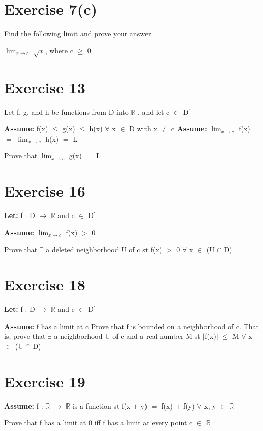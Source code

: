 \documentclass{article}
\newcommand{\mt}[1]{\ensuremath{#1}}
\newcommand\bsc[2][\DefaultOpt]{%
  \def\DefaultOpt{#2}%
  \section[#1]{#2}%
}
\newcommand{\lt}[1]{\textbf{Let: } #1}
\newcommand{\as}[1]{\textbf{Assume: } #1}
\newcommand{\br}{\mt{\mathbb{R}} }       %
\newcommand{\fa}{\mt{\forall} }          %
\newcommand{\mem}{\mt{\in} }
\newcommand{\exs}{\mt{\exists} }
\newcommand{\lra}{ \mt{\longrightarrow} } %
\newcommand{\av}[1]{\mt{|}#1\mt{|}}  %
\newcommand{\ps}{\mt{+} }
\newcommand{\gr}{\mt{>} }
\newcommand{\lse}{\mt{\leq} }
\newcommand{\gre}{\mt{\geq} }
\newcommand{\eql}{\mt{=} }
\newcommand{\pr}{\mt{^\prime} } 		   %
\newcommand{\limt}[2]{\mt{\displaystyle{\lim_{#1 \to #2}}}}
\newcommand{\inn}{\mt{\cap} }
\begin{document}
\bsc{Exercise 7(c)}{

Find the following limit and prove your answer.

\limt{x}{c} $\sqrt{x}$, where c \gre 0
}

\bsc{Exercise 13}{

Let f, g, and h be functions from D into \br, and let c \mem D\pr

\as{f(x) \lse g(x) \lse h(x) \fa x \mem D with x $\neq$ c}
\as{\limt{x}{c} f(x) \eql \limt{x}{c} h(x) \eql L}

Prove that \limt{x}{c} g(x) \eql L

}

\bsc{Exercise 16}{

\lt{f : D \lra \br and c \mem D\pr}

\as{\limt{x}{c} f(x) \gr 0}

Prove that \exs a deleted neighborhood U of c st f(x) \gr 0 \fa x \mem (U \inn D)

}

\bsc{Exercise 18}{

\lt{f : D \lra \br and c \mem D\pr}

\as{f has a limit at c}
Prove that f is bounded on a neighborhood of c. That is, prove that \exs a neighborhood U of c and a real number M st \av{f(x)} \lse M \fa x \mem (U \inn D)

}

\bsc{Exercise 19}{

\as{f : \br \lra \br is a function st f(x \ps y) \eql f(x) \ps f(y) \fa x, y \mem \br}

Prove that f has a limit at 0 iff f has a limit at every point c \mem \br

}
\end{document}
